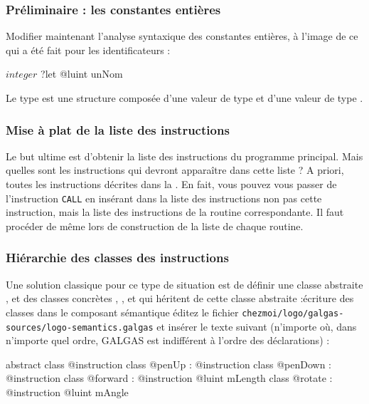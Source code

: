 \subsubsection{Préliminaire : les constantes entières}

Modifier maintenant l’analyse syntaxique des constantes entières, à l’image de ce qui a été fait pour les identificateurs :
\begin{galgascode}
$integer$ ?let @luint unNom
\end{galgascode}

Le type  est une structure composée d’une valeur de type  et d’une valeur de type .

\subsubsection{Mise à plat de la liste des instructions}
Le but ultime est d'obtenir la liste des instructions du programme principal. Mais quelles sont les instructions qui devront apparaître dans cette liste ? A priori, toutes les instructions décrites dans la . En fait, vous pouvez vous passer de l'instruction \texttt{CALL} en insérant dans la liste des instructions non pas cette instruction, mais la liste des instructions de la routine correspondante. Il faut procéder de même lors de construction de la liste de chaque routine.

\subsubsection{Hiérarchie des classes des instructions}
Une solution classique pour ce type de situation est de définir une classe abstraite , et des classes concrètes , ,  et  qui héritent de cette classe abstraite :écriture des classes dans le composant sémantique éditez le fichier \texttt{chezmoi/logo/galgas-sources/logo-semantics.galgas} et insérer le texte suivant (n’importe où, dans n’importe quel ordre, GALGAS est indifférent à l’ordre des déclarations) :

\begin{galgascode}
abstract class @instruction {
}
class @penUp : @instruction {
}
class @penDown : @instruction {
}
class @forward : @instruction {
  @luint mLength
}
class @rotate : @instruction {
  @luint mAngle
}
\end{galgascode}


